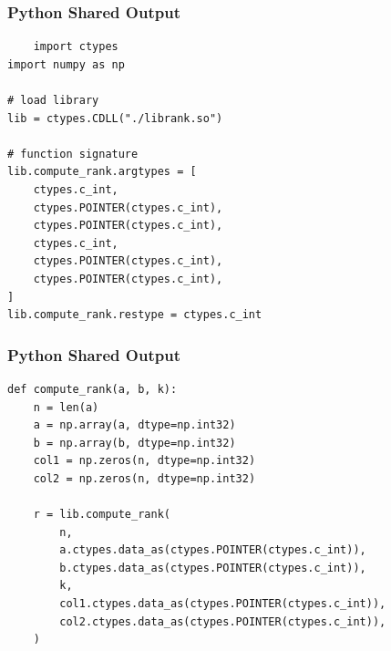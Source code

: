 \documentclass{beamer}
\begin{document}
\begin{frame}[fragile]
    \frametitle{Python Shared Output}
    \begin{lstlisting}
    import ctypes
import numpy as np

# load library
lib = ctypes.CDLL("./librank.so")

# function signature
lib.compute_rank.argtypes = [
    ctypes.c_int,
    ctypes.POINTER(ctypes.c_int),
    ctypes.POINTER(ctypes.c_int),
    ctypes.c_int,
    ctypes.POINTER(ctypes.c_int),
    ctypes.POINTER(ctypes.c_int),
]
lib.compute_rank.restype = ctypes.c_int
  \end{lstlisting}
    \end{frame}
 
\begin{frame}[fragile]
    \frametitle{Python Shared Output}
    \begin{lstlisting}
def compute_rank(a, b, k):
    n = len(a)
    a = np.array(a, dtype=np.int32)
    b = np.array(b, dtype=np.int32)
    col1 = np.zeros(n, dtype=np.int32)
    col2 = np.zeros(n, dtype=np.int32)

    r = lib.compute_rank(
        n,
        a.ctypes.data_as(ctypes.POINTER(ctypes.c_int)),
        b.ctypes.data_as(ctypes.POINTER(ctypes.c_int)),
        k,
        col1.ctypes.data_as(ctypes.POINTER(ctypes.c_int)),
        col2.ctypes.data_as(ctypes.POINTER(ctypes.c_int)),
    )
      \end{lstlisting}
    \end{frame}
 
\end{document}
